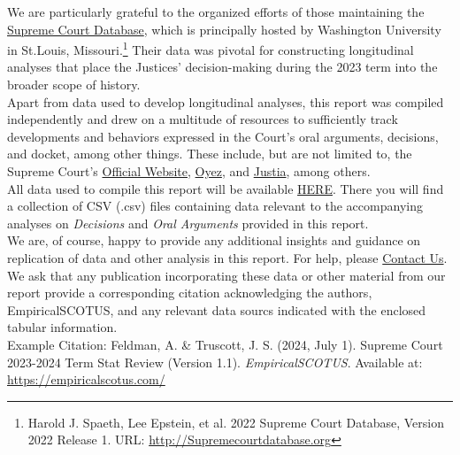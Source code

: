 
\noindent We are particularly grateful to the organized efforts of those maintaining the \textcolor{blue}{\href{http://scdb.wustl.edu/}{Supreme Court Database}}, which is principally hosted by Washington University in St.Louis, Missouri.\footnote{Harold J. Spaeth, Lee Epstein, et al. 2022 Supreme Court Database, Version 2022 Release 1. URL: \url{http://Supremecourtdatabase.org}} Their data was pivotal for constructing longitudinal analyses that place the Justices' decision-making during the 2023 term into the broader scope of history. \\

\noindent Apart from data used to develop longitudinal analyses, this report was compiled independently and drew on a multitude of resources to sufficiently track developments and behaviors expressed in the Court's oral arguments, decisions, and docket, among other things. These include, but are not limited to, the Supreme Court's \textcolor{blue}{\href{https://www.supremecourt.gov/}{Official Website}}, \textcolor{blue}{\href{https://www.oyez.org/}{Oyez}}, and \textcolor{blue}{\href{https://www.justia.com/}{Justia}}, among others. \\

\noindent All data used to compile this report will be available \textcolor{blue}{\href{https://empiricalscotus.com/2023-stats/}{HERE}}. There you will find a collection of CSV (.csv) files containing data relevant to the accompanying analyses on \emph{Decisions} and \emph{Oral Arguments} provided in this report. \\

\noindent We are, of course, happy to provide any additional insights and guidance on replication of data and other analysis in this report. For help, please \textcolor{blue}{\href{mailto:adam@feldmannet.com}{Contact Us}}. \\

\noindent We ask that any publication incorporating these data or other material from our report provide a corresponding citation acknowledging the authors, EmpiricalSCOTUS, and any relevant data sourcs indicated with the enclosed tabular information. \\

\noindent Example Citation: Feldman, A. \& Truscott, J. S. (2024, July 1). Supreme Court 2023-2024 Term Stat Review (Version 1.1). \emph{EmpiricalSCOTUS}. Available at: \url{https://empiricalscotus.com/}
